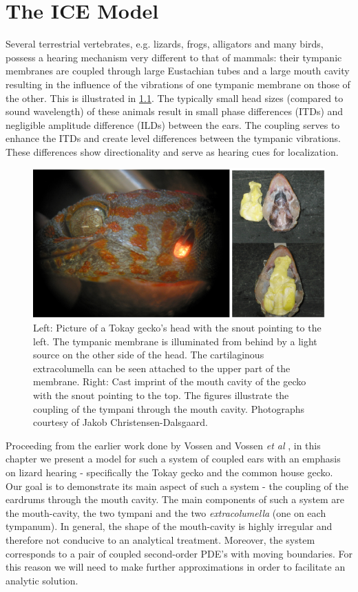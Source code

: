 \chapter{The ICE Model}\label{modelchapter}
Several terrestrial vertebrates, e.g. lizards, frogs, alligators and many birds, possess a hearing mechanism very different to
that of mammals: their tympanic membranes are coupled through large Eustachian tubes and a large mouth cavity resulting in the influence of the vibrations of one tympanic membrane
on those of the other. This is illustrated in \ref{geckohead}. The typically small head sizes (compared to sound wavelength) of these animals result in
small phase differences (ITDs) and negligible amplitude difference (ILDs) between the ears. The coupling serves to enhance the ITDs and create level differences
between the tympanic vibrations. These differences show directionality and serve as hearing cues for localization.

\begin{figure}[ht!]
 \centering
 \includegraphics[width=.85\linewidth]{Diagrams/geckohead1.png}
 \caption[Illustration of a gecko's head]{Left: Picture of a Tokay gecko's head with the snout pointing to the left. The tympanic membrane is illuminated from behind by
 a light source on the other side of the head. The cartilaginous extracolumella can be seen attached to the upper part of the membrane.
 Right: Cast imprint of the mouth cavity of the gecko with the snout pointing to the top. The figures illustrate the coupling of the tympani through the mouth cavity.
 Photographs courtesy of Jakob Christensen-Dalsgaard.}
  \label{geckohead}
\end{figure}

Proceeding from the earlier work done by Vossen \cite{vossenthesis} and Vossen \emph{et al} \cite{vossenjasa}, in this chapter we present a model for such a system of coupled ears with an emphasis on lizard hearing
- specifically the Tokay gecko and the common house gecko. Our goal is to demonstrate its main aspect of such a system - the coupling
of the eardrums through the mouth cavity. 
The main components of such a system are the mouth-cavity, the two tympani and the two \textit{extracolumella} (one on each tympanum). In general, the shape of the mouth-cavity is highly irregular and therefore
not conducive to an analytical treatment. Moreover, the system corresponds to a pair of coupled second-order PDE's with
moving boundaries. For this reason we will need to make further approximations in order to facilitate an
analytic solution.

